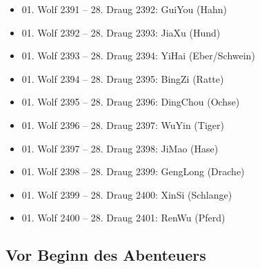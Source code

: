 \documentclass[
a4paper,
twoside,
DIV=calc,
BCOR=4mm,
fontsize=9pt,
twocolumn=on,
titlepage=on,
parskip=half
]{scrartcl}
\begin{document}
\begin{itemize}
\item 01. Wolf 2391 -- 28. Draug 2392: GuiYou (Hahn)
\item 01. Wolf 2392 -- 28. Draug 2393: JiaXu (Hund)
\item 01. Wolf 2393 -- 28. Draug 2394: YiHai (Eber/Schwein)
\item 01. Wolf 2394 -- 28. Draug 2395: BingZi (Ratte)
\item 01. Wolf 2395 -- 28. Draug 2396: DingChou (Ochse)
\item 01. Wolf 2396 -- 28. Draug 2397: WuYin (Tiger)
\item 01. Wolf 2397 -- 28. Draug 2398: JiMao (Hase)
\item 01. Wolf 2398 -- 28. Draug 2399: GengLong (Drache)
\item 01. Wolf 2399 -- 28. Draug 2400: XinSi (Schlange)
\item 01. Wolf 2400 -- 28. Draug 2401: RenWu (Pferd)
\end{itemize}

\subsection{Vor Beginn des Abenteuers}
\end{document}
